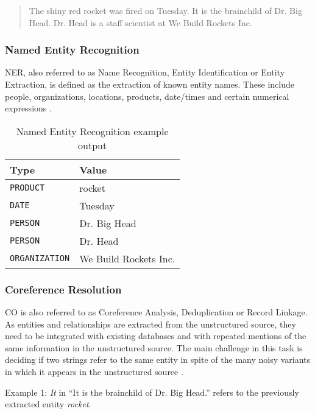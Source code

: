 \begin{quote}
The shiny red rocket was fired on Tuesday. It is the brainchild of Dr. Big Head. Dr. Head is a staff scientist at We Build Rockets Inc.
\cite{Cunningham:2005}
\end{quote}


\subsubsection{Named Entity Recognition}
\gls{NER}, also referred to as Name Recognition, Entity Identification or Entity Extraction, is defined as the extraction of known entity names. These include people, organizations, locations, products, date/times and certain numerical expressions \cite{Linsmayr:2010}. 

\begin{table}[H]
\centering
\begin{tabular*}{\textwidth}{ l  l }
	\toprule
	\textbf{Type} & \textbf{Value} \\
	\midrule
	\texttt{PRODUCT} & rocket \\
	\texttt{DATE} & Tuesday \\
	\texttt{PERSON} & Dr. Big Head \\
	\texttt{PERSON} & Dr. Head \\
	\texttt{ORGANIZATION} & We Build Rockets Inc. \\
	\bottomrule
\end{tabular*}
\caption{Named Entity Recognition example output}
\end{table}

\subsubsection{Coreference Resolution}
\gls{CO} is also referred to as Coreference Analysis, Deduplication or Record Linkage. As entities and relationships are extracted from the unstructured source, they need to be integrated with existing databases and with repeated mentions of the same information in the unstructured source.  The main challenge in this task is deciding if two strings refer to the same entity in spite of the many noisy variants in which it appears in the unstructured source \cite{Sarawagi:2008}.

Example 1: \textit{It} in \enquote{It is the brainchild of Dr. Big Head.} refers to the previously extracted entity \textit{rocket}.

